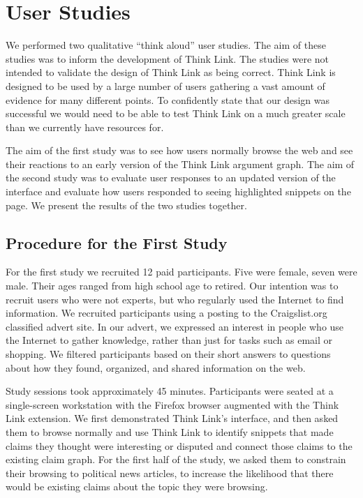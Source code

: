 \documentclass{chi2009}
\newcommand{\todo}[1]{}
\begin{document}
\section{User Studies}

We performed two qualitative ``think aloud'' user studies. The aim of these studies was to inform the development of Think Link. The studies were not intended to validate the design of Think Link as being correct. Think Link is designed to be used by a large number of users gathering a vast amount of evidence for many different points. To confidently state that our design was successful we would need to be able to test Think Link on a much greater scale than we currently have resources for.

The aim of the first study was to see how users normally browse the web and see their reactions to an early version of the Think Link argument graph. The aim of the second study was to evaluate user responses to an updated version of the interface and evaluate how users responded to seeing highlighted snippets on the page. We present the results of the two studies together.

\subsection{Procedure for the First Study}

For the first study we recruited 12 paid participants. Five were female, seven were male. Their ages ranged from high school age to retired. Our intention was to recruit users who were not experts, but who regularly used the Internet to find information. We recruited participants using a posting to the Craigslist.org classified advert site. In our advert, we expressed an interest in people who use the Internet to gather knowledge, rather than just for tasks such as email or shopping. We filtered participants based on their short answers to questions about how they found, organized, and shared information on the web. 

\todo{This was a bad recruiting strategy. We should have recruited people that fitted one of our two personas and then set them tasks that fitted our vision for that persona.}

Study sessions took approximately 45 minutes. Participants were seated at a single-screen workstation with the Firefox browser augmented with the Think Link extension. We first demonstrated Think Link's interface, and then asked them to browse normally and use Think Link to identify snippets that made claims they thought were interesting or disputed and connect those claims to the existing claim graph. For the first half of the study, we asked them to constrain their browsing to political news articles, to increase the likelihood that there would be existing claims about the topic they were browsing.
\end{document}
